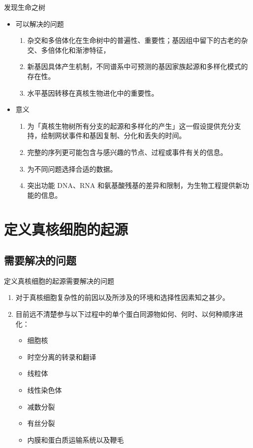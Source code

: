 \documentclass{beamer}
\begin{document}

	\begin{frame}{发现生命之树}
		\begin{itemize}
		\item 可以解决的问题
		\begin{enumerate}
			\item 杂交和多倍体化在生命树中的普遍性、重要性；基因组中留下的古老的杂交、多倍体化和渐渗特征，
			\item 新基因具体产生机制，不同谱系中可预测的基因家族起源和多样化模式的存在性。
			\item 水平基因转移在真核生物进化中的重要性。
		\end{enumerate}
		\item 意义
		\begin{enumerate}
			\item 为「真核生物树所有分支的起源和多样化的产生」这一假设提供充分支持，绘制网状事件和基因复制、分化和丢失的时间。
			\item 完整的序列更可能包含与感兴趣的节点、过程或事件有关的信息。
			\item 为不同问题选择合适的数据。
			\item 突出功能 DNA、RNA 和氨基酸残基的差异和限制，为生物工程提供新功能的信息。
		\end{enumerate}
	\end{itemize}
	\end{frame}


	\section{定义真核细胞的起源}
	\subsection*{需要解决的问题}
	\begin{frame}{定义真核细胞的起源}{需要解决的问题}
		\begin{enumerate}
			\item 对于真核细胞复杂性的前因以及所涉及的环境和选择性因素知之甚少。
			\item 目前远不清楚参与以下过程中的单个蛋白同源物如何、何时、以何种顺序进化：
			\begin{itemize}
				\item 细胞核
				\item 时空分离的转录和翻译
				\item 线粒体
				\item 线性染色体
				\item 减数分裂
				\item 有丝分裂
				\item 内膜和蛋白质运输系统以及鞭毛
			\end{itemize}
		\end{enumerate}

	\end{frame}
\end{document}

